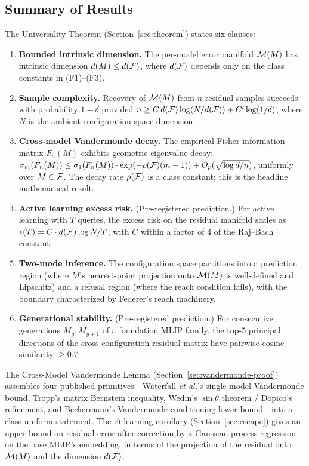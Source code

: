 \subsection{Summary of Results}

The Universality Theorem (Section~\ref{sec:theorem}) states six clauses:
\begin{enumerate}[label=(\roman*)]
    \item \textbf{Bounded intrinsic dimension.} The per-model error manifold $\mathcal{M}(M)$ has intrinsic dimension $d(M) \leq d(\mathcal{F})$, where $d(\mathcal{F})$ depends only on the class constants in (F1)--(F3).
    \item \textbf{Sample complexity.} Recovery of $\mathcal{M}(M)$ from $n$ residual samples succeeds with probability $1-\delta$ provided $n \geq C \, d(\mathcal{F}) \log(N/d(\mathcal{F})) + C' \log(1/\delta)$, where $N$ is the ambient configuration-space dimension.
    \item \textbf{Cross-model Vandermonde decay.} The empirical Fisher information matrix $F_n(M)$ exhibits geometric eigenvalue decay: $\sigma_m(F_n(M)) \leq \sigma_1(F_n(M)) \cdot \exp(-\rho(\mathcal{F})(m-1)) + O_p(\sqrt{\log d / n})$, uniformly over $M \in \mathcal{F}$. The decay rate $\rho(\mathcal{F})$ is a class constant; this is the headline mathematical result.
    \item \textbf{Active learning excess risk.} (Pre-registered prediction.) For active learning with $T$ queries, the excess risk on the residual manifold scales as $\epsilon(T) = C \cdot d(\mathcal{F}) \log N / T$, with $C$ within a factor of 4 of the Raj--Bach\cite{raj2022convergence} constant.
    \item \textbf{Two-mode inference.} The configuration space partitions into a prediction region (where $M$'s nearest-point projection onto $\mathcal{M}(M)$ is well-defined and Lipschitz) and a refusal region (where the reach condition fails), with the boundary characterized by Federer's reach machinery\cite{federer1959curvature}.
    \item \textbf{Generational stability.} (Pre-registered prediction.) For consecutive generations $M_g, M_{g+1}$ of a foundation MLIP family, the top-5 principal directions of the cross-configuration residual matrix have pairwise cosine similarity $\geq 0.7$.
\end{enumerate}

The Cross-Model Vandermonde Lemma (Section~\ref{sec:vandermonde-proof}) assembles four published primitives---Waterfall \emph{et al.}'s single-model Vandermonde bound\cite{waterfall2006sloppy}, Tropp's matrix Bernstein inequality\cite{tropp2012user}, Wedin's $\sin\theta$ theorem\cite{wedin1972perturbation} / Dopico's refinement\cite{dopico2000sin}, and Beckermann's Vandermonde conditioning lower bound\cite{beckermann2000condition}---into a class-uniform statement. The $\Delta$-learning corollary (Section~\ref{sec:escape}) gives an upper bound on residual error after correction by a Gaussian process regression on the base MLIP's embedding, in terms of the projection of the residual onto $\mathcal{M}(M)$ and the dimension $d(\mathcal{F})$.

